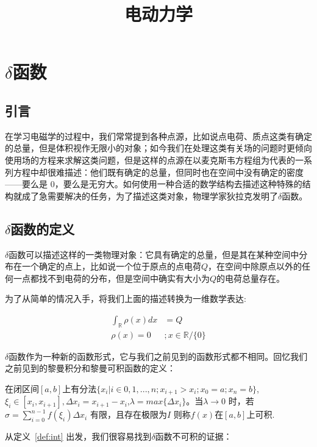 \documentclass[lang=cn,10pt,newtx,bibend=biber,device=pad]{elegantbook}
\title{电动力学}
\begin{document}
\section{$\delta$函数}

\subsection{引言}

在学习电磁学的过程中，我们常常提到各种点源，比如说点电荷、质点这类有确定的总量，但是体积视作无限小的对象；如今我们在处理这类有关场的问题时更倾向使用场的方程来求解这类问题，但是这样的点源在以麦克斯韦方程组为代表的一系列方程中却很难描述：他们既有确定的总量，但同时也在空间中没有确定的密度——要么是 0，要么是无穷大。如何使用一种合适的数学结构去描述这种特殊的结构就成了急需要解决的任务，为了描述这类对象，物理学家狄拉克发明了$\delta$函数。

\subsection{$\delta$函数的定义}

$\delta$函数可以描述这样的一类物理对象：它具有确定的总量，但是其在某种空间中分布在一个确定的点上，比如说一个位于原点的点电荷$Q$，在空间中除原点以外的任何一点都找不到电荷的分布，但是空间中确实有大小为$Q $的电荷总量存在。

为了从简单的情况入手，将我们上面的描述转换为一维数学表达\cite{Robert1994}:

\begin{equation}
\begin{align}

\int_{\mathbb{R}}\rho(x)dx&=Q \\\rho(x)=0&;x\in\mathbb{R}/\{0\}

\end{align}
\end{equation}\label{eq:delta_ini}

$\delta$函数作为一种新的函数形式，它与我们之前见到的函数形式都不相同。回忆我们之前见到的黎曼积分和黎曼可积函数的定义：

\begin{definition}[可积函数]\label{def:int}
    在闭区间$[a,b]$上有分法$\{x_i|i\in {0,1,...,n};x_{i+1}>x_i;x_0 =a;x_n=b\}$,$\xi_i \in [x_{i},x_{i+1}],\Delta x_i = x_{i+1} - x_i$,$\lambda = max \{ \Delta x_i \}$。当$\lambda \rightarrow0$ 时，若$\sigma = \sum_{i=0}^{n-1}f(\xi_i)\Delta x_i$ 有限，且存在极限为$I$ 则称$f(x)$在$[a,b]$上可积.
\end{definition}
从定义~\ref{def:int} 出发，我们很容易找到$\delta$函数不可积的证据：
\end{document}
